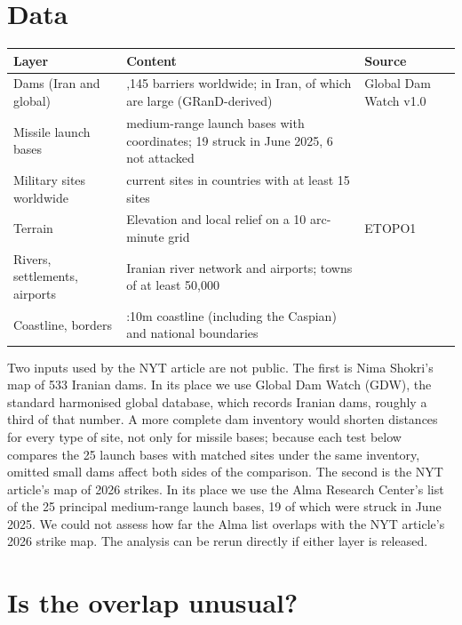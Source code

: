 \documentclass[numbered]{saim-blog}
\begin{document}
\section{Data}
\begin{center}
\small
\begin{tabularx}{\linewidth}{@{}>{\RaggedRight}p{2.5cm}>{\RaggedRight}X>{\RaggedRight}p{3.4cm}@{}}
\toprule
Layer & Content & Source \\
\midrule
Dams (Iran and global) & 41,145 barriers worldwide; \NDams{} in Iran, of which \NLargeDams{} are large (GRanD-derived) & Global Dam Watch v1.0 \citep{lehner2024gdw,lehner2011grand} \\
Missile launch bases & \NBases{} medium-range launch bases with coordinates; 19 struck in June 2025, 6 not attacked & \citet{alma2026} \\
Military sites worldwide & \GBases{} current sites in \GCountries{} countries with at least 15 sites & \citet{wikidata} \\
Terrain & Elevation and local relief on a 10 arc-minute grid & ETOPO1 \citep{amante2009etopo1} \\
Rivers, settlements, airports & Iranian river network and airports; towns of at least 50,000 & \citet{globalmapiran,naturalearth} \\
Coastline, borders & 1:10m coastline (including the Caspian) and national boundaries & \citet{naturalearth} \\
\bottomrule
\end{tabularx}
\end{center}
Two inputs used by the NYT article are not public. The first is Nima Shokri's map of 533 Iranian dams. In its place we use Global Dam Watch (GDW), the standard harmonised global database, which records \NDams{} Iranian dams, roughly a third of that number. A more complete dam inventory would shorten distances for every type of site, not only for missile bases; because each test below compares the 25 launch bases with matched sites under the same inventory, omitted small dams affect both sides of the comparison. The second is the NYT article's map of 2026 strikes. In its place we use the Alma Research Center's list of the 25 principal medium-range launch bases, 19 of which were struck in June 2025. We could not assess how far the Alma list overlaps with the NYT article's 2026 strike map. The analysis can be rerun directly if either layer is released.

\section{Is the overlap unusual?}
\label{sec:test}
\end{document}
